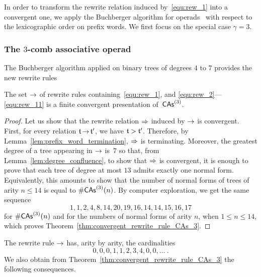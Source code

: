 In order to transform the rewrite relation induced by~\eqref{equ:rew_1}
into a convergent one, we apply the Buchberger algorithm for
operads~\cite[Section 3.7]{DK10} with respect to the lexicographic order
on prefix words. We first focus on the special case $\gamma = 3$.
\subsubsection{The \texorpdfstring{$3$}{3}-comb associative operad}
\label{subsubsec:CAs_3}

The Buchberger algorithm applied on binary trees of degrees $4$ to $7$ 
provides the new rewrite rules \smallbreak

\medbreak

\begin{Theorem} \label{thm:convergent_rewrite_rule_CAs_3}
    The set $\operatorname{\to}$ of rewrite rules containing~\eqref{equ:rew_1},
    and \eqref{equ:rew_2}---\eqref{equ:rew_11} is a finite
    convergent presentation of~$\mathsf{CAs}^{\left(3\right)}$.
\end{Theorem}
\begin{proof}
    Let us show that the rewrite relation $\operatorname{\Rightarrow}$ induced by
    $\operatorname{\to}$ is convergent. First, for every relation $\mathfrak{t} \operatorname{\to} \mathfrak{t}'$,
    we have $\mathfrak{t} > \mathfrak{t}'$. Therefore, by
    Lemma~\ref{lem:prefix_word_termination}, $\operatorname{\Rightarrow}$ is
    terminating. Moreover, the greatest degree of a tree appearing in
    $\operatorname{\to}$ is~$7$ so that, from Lemma~\ref{lem:degree_confluence}, to
    show that $\operatorname{\Rightarrow}$ is convergent, it is enough to prove that
    each tree of degree at most $13$ admits exactly one normal form.
    Equivalently, this amounts to show that the number of normal forms
    of trees of arity $n\leq 14$ is equal to $\#\mathsf{CAs}^{\left(3\right)}(n)$. By computer
    exploration, we get the same sequence
    \begin{equation} \label{equ:dimensions_CAs_3}
        1, 1, 2, 4, 8, 14, 20, 19, 16, 14, 14, 15, 16, 17
    \end{equation}
    for $\#\mathsf{CAs}^{\left(3\right)}(n)$ and for the numbers of normal forms of arity $n$,
    when $ 1 \leq n \leq 14$, which proves
    Theorem~\ref{thm:convergent_rewrite_rule_CAs_3}.
\end{proof}
\medbreak

The rewrite rule $\operatorname{\to}$ has, arity by arity, the cardinalities
\begin{equation}
    0, 0, 0, 1, 1, 2, 3, 4, 0, 0, \dots~.
\end{equation}
We also obtain from Theorem~\ref{thm:convergent_rewrite_rule_CAs_3} 
the following consequences.
\medbreak


